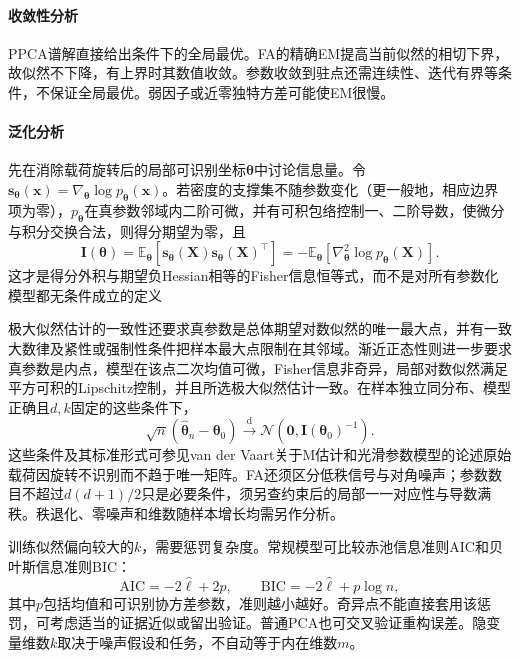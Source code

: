 \paragraph{收敛性分析}

PPCA谱解直接给出条件下的全局最优。FA的精确EM提高当前似然的相切下界，故似然不下降，有上界时其数值收敛。参数收敛到驻点还需连续性、迭代有界等条件，不保证全局最优。弱因子或近零独特方差可能使EM很慢。

\paragraph{泛化分析}

先在消除载荷旋转后的局部可识别坐标$\bm{\theta}$中讨论信息量。令$\bm{s}_{\bm{\theta}}(\bm{x})=\nabla_{\bm{\theta}}\log p_{\bm{\theta}}(\bm{x})$。若密度的支撑集不随参数变化（更一般地，相应边界项为零），$p_{\bm{\theta}}$在真参数邻域内二阶可微，并有可积包络控制一、二阶导数，使微分与积分交换合法，则得分期望为零，且
\[
  \bm{I}(\bm{\theta})
  =\mathbb{E}_{\bm{\theta}}\!\left[
      \bm{s}_{\bm{\theta}}(\bm{X})
      \bm{s}_{\bm{\theta}}(\bm{X})^{\top}
    \right]
  =-\mathbb{E}_{\bm{\theta}}\!\left[
      \nabla_{\bm{\theta}}^2\log p_{\bm{\theta}}(\bm{X})
    \right].
\]
这才是得分外积与期望负Hessian相等的Fisher信息恒等式，而不是对所有参数化模型都无条件成立的定义

极大似然估计的一致性还要求真参数是总体期望对数似然的唯一最大点，并有一致大数律及紧性或强制性条件把样本最大点限制在其邻域。渐近正态性则进一步要求真参数是内点，模型在该点二次均值可微，Fisher信息非奇异，局部对数似然满足平方可积的Lipschitz控制，并且所选极大似然估计一致。在样本独立同分布、模型正确且$d,k$固定的这些条件下，
\[
  \sqrt{n}(\widehat{\bm{\theta}}_n-\bm{\theta}_0)
  \xrightarrow{\mathrm d}
  \mathcal{N}\!\left(
    \bm{0},\bm{I}(\bm{\theta}_0)^{-1}
  \right).
\]
这些条件及其标准形式可参见van der Vaart关于M估计和光滑参数模型的论述原始载荷因旋转不识别而不趋于唯一矩阵。FA还须区分低秩信号与对角噪声；参数数目不超过$d(d+1)/2$只是必要条件，须另查约束后的局部一一对应性与导数满秩。秩退化、零噪声和维数随样本增长均需另作分析。

训练似然偏向较大的$k$，需要惩罚复杂度。常规模型可比较赤池信息准则AIC和贝叶斯信息准则BIC：
\[
\mathrm{AIC}=-2\hat{\ell}+2p,\qquad
\mathrm{BIC}=-2\hat{\ell}+p\log n,
\]
其中$p$包括均值和可识别协方差参数，准则越小越好。奇异点不能直接套用该惩罚，可考虑适当的证据近似或留出验证。普通PCA也可交叉验证重构误差。隐变量维数$k$取决于噪声假设和任务，不自动等于内在维数$m$。

